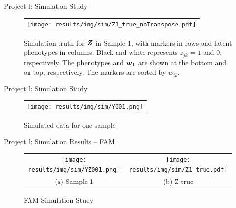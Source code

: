 \documentclass[ignorenonframetext,]{beamer}
\newcommand{\true}{{\mbox{\tiny TR}}}
\newcommand{\bZ}{\mbox{\boldmath $Z$}}
\newcommand{\bw}{\mbox{\boldmath $w$}}
\begin{document}
\begin{frame}{Project I: Simulation Study}
\begin{figure}
\begin{center}
\begin{tabular}{c}
\texttt{[image: results/img/sim/Z1\_true\_noTranspose.pdf]}
\end{tabular}
\end{center}
\vspace{-0.05in} \caption{Simulation truth for $\bZ$ in Sample 1, with markers in
rows and latent phenotypes in columns. Black and white represents
$z_{jk}=1$ and 0, respectively. The phenotypes and $\bw_1$ are
shown at the bottom and on top, respectively. The markers
are sorted by $w_{ik}$.}
\end{figure}
\end{frame}

\begin{frame}{Project I: Simulation Study}
\begin{figure}
\begin{center}
\begin{tabular}{c}
\texttt{[image: results/img/sim/Y001.png]}
\end{tabular}
\end{center}
\vspace{-0.05in} \caption{Simulated data for one sample}
\end{figure}
\end{frame}

\begin{frame}{Project I: Simulation Results -- FAM}
\vspace{-1em}\begin{figure}
  \begin{center}
  \begin{tabular}{cc}
  \texttt{[image: results/img/sim/YZ001.png]}&
  \texttt{[image: results/img/sim/Z1\_true.pdf]}\\
  {\small (a) Sample 1} & {\small(b) Z true} \\
  \end{tabular}
  \end{center}
  \vspace{-0.05in}
  \caption{FAM Simulation Study}
\end{figure}
\end{frame}
\end{document}
